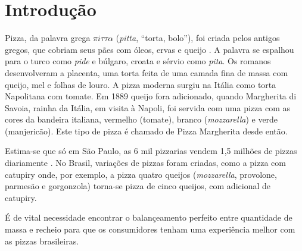 \section{Introdução}

Pizza, da palavra grega $\pi i \tau \tau \alpha$ (\textsl{pitta}, 
``torta, bolo''), foi criada pelos antigos gregos, que cobriam seus pães com 
óleos, ervas e 
queijo \cite{civitello2007cuisine}.  A palavra se espalhou para o
turco como \textsl{pide} e búlgaro, croata e sérvio como \textsl{pita}.
Os romanos desenvolveram a placenta, uma torta feita de uma camada fina de massa
com queijo, mel e folhas de louro.  A pizza moderna surgiu na Itália como
torta Napolitana com tomate.  Em 1889 queijo fora adicionado, quando
Margherita di Savoia, rainha da Itália, em visita à Napoli, foi servida
com uma pizza com as cores da bandeira italiana, vermelho (tomate), 
branco (\textsl{mozzarella}) e verde (manjericão).  Este tipo de pizza é 
chamado de Pizza Margherita desde então.

Estima-se que só em São Paulo, as 6 mil pizzarias vendem 1,5 milhões
de pizzas diariamente \cite{SPPizza}.  No Brasil, variações de pizzas foram
criadas, como a pizza com catupiry onde, por exemplo, a pizza 
quatro queijos
(\textsl{mozzarella}, provolone, parmesão e gorgonzola) torna-se pizza de
cinco queijos, com adicional de catupiry.

É de vital necessidade encontrar o balançeamento perfeito entre quantidade
de massa e recheio para que os consumidores tenham uma experiência melhor
com as pizzas brasileiras.



